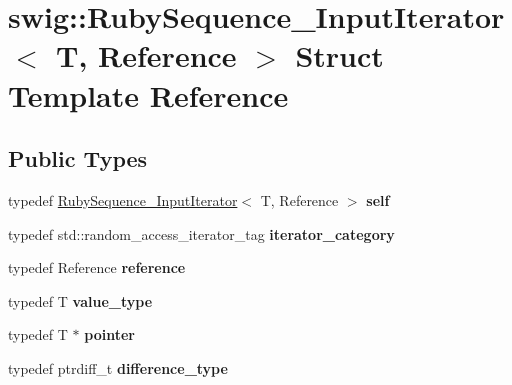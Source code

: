 \hypertarget{structswig_1_1RubySequence__InputIterator}{}\section{swig\+:\+:Ruby\+Sequence\+\_\+\+Input\+Iterator$<$ T, Reference $>$ Struct Template Reference}
\label{structswig_1_1RubySequence__InputIterator}
\subsection*{Public Types}
\begin{DoxyCompactItemize}
\item 
typedef \hyperlink{structswig_1_1RubySequence__InputIterator}{Ruby\+Sequence\+\_\+\+Input\+Iterator}$<$ T, Reference $>$ {\bfseries self}\hypertarget{structswig_1_1RubySequence__InputIterator_a1abd78e5f495725e9bca6d13b6dbaf29}{}\label{structswig_1_1RubySequence__InputIterator_a1abd78e5f495725e9bca6d13b6dbaf29}

\item 
typedef std\+::random\+\_\+access\+\_\+iterator\+\_\+tag {\bfseries iterator\+\_\+category}\hypertarget{structswig_1_1RubySequence__InputIterator_a7e2f5088270cec90c621b58fddba022e}{}\label{structswig_1_1RubySequence__InputIterator_a7e2f5088270cec90c621b58fddba022e}

\item 
typedef Reference {\bfseries reference}\hypertarget{structswig_1_1RubySequence__InputIterator_a48511173c81c4f11391ecfb5d6fa4d19}{}\label{structswig_1_1RubySequence__InputIterator_a48511173c81c4f11391ecfb5d6fa4d19}

\item 
typedef T {\bfseries value\+\_\+type}\hypertarget{structswig_1_1RubySequence__InputIterator_a5db290394c08dec4977290248b586ed8}{}\label{structswig_1_1RubySequence__InputIterator_a5db290394c08dec4977290248b586ed8}

\item 
typedef T $\ast$ {\bfseries pointer}\hypertarget{structswig_1_1RubySequence__InputIterator_a95499975068f151bc25c6dd087452068}{}\label{structswig_1_1RubySequence__InputIterator_a95499975068f151bc25c6dd087452068}

\item 
typedef ptrdiff\+\_\+t {\bfseries difference\+\_\+type}\hypertarget{structswig_1_1RubySequence__InputIterator_afe51fb9b0ff991c9ea54d33a31faff6c}{}\label{structswig_1_1RubySequence__InputIterator_afe51fb9b0ff991c9ea54d33a31faff6c}

\end{DoxyCompactItemize}
